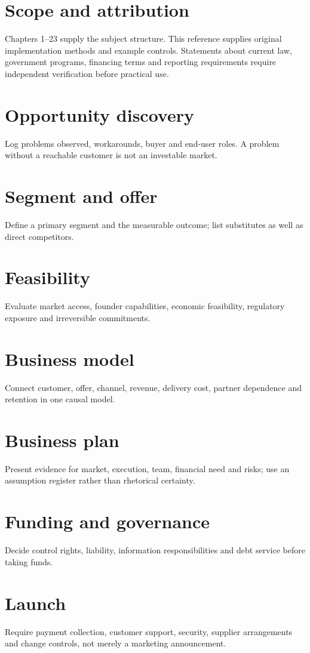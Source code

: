 \documentclass[11pt]{article}
\begin{document}
\SuiteOpen\tableofcontents
\section{Scope and attribution}
Chapters 1--23 supply the subject structure. This reference supplies original implementation methods and example controls. Statements about current law, government programs, financing terms and reporting requirements require independent verification before practical use.
\section{Opportunity discovery}
Log problems observed, workarounds, buyer and end-user roles. A problem without a reachable customer is not an investable market.
\section{Segment and offer}
Define a primary segment and the measurable outcome; list substitutes as well as direct competitors.
\section{Feasibility}
Evaluate market access, founder capabilities, economic feasibility, regulatory exposure and irreversible commitments.
\section{Business model}
Connect customer, offer, channel, revenue, delivery cost, partner dependence and retention in one causal model.
\section{Business plan}
Present evidence for market, execution, team, financial need and risks; use an assumption register rather than rhetorical certainty.
\section{Funding and governance}
Decide control rights, liability, information responsibilities and debt service before taking funds.
\section{Launch}
Require payment collection, customer support, security, supplier arrangements and change controls, not merely a marketing announcement.
\end{document}
